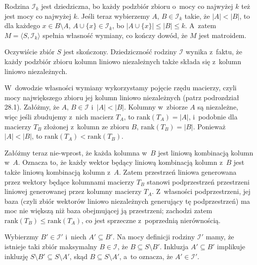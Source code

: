 
\exercise %
Rodzina $\mathcal{I}_k$ jest dziedziczna, bo każdy podzbiór zbioru o~mocy co najwyżej $k$ też jest mocy co najwyżej $k$.
Jeśli teraz wybierzemy $A$, $B\in\mathcal{I}_k$ takie, że $|A|<|B|$, to dla każdego $x\in B\setminus A$, $A\cup\{x\}\in\mathcal{I}_k$, bo $|A\cup\{x\}|\le|B|\le k$.
A~zatem $M=\langle S,\mathcal{I}_k\rangle$ spełnia własność wymiany, co kończy dowód, że $M$ jest matroidem.

\exercise %

\noindent Oczywiście zbiór $S$ jest skończony.
Dziedziczność rodziny $\mathcal{I}$ wynika z~faktu, że każdy podzbiór zbioru kolumn liniowo niezależnych także składa się z~kolumn liniowo niezależnych.

W~dowodzie własności wymiany wykorzystamy pojęcie rzędu macierzy, czyli mocy największego zbioru jej kolumn liniowo niezależnych (patrz podrozdział 28.1).
Załóżmy, że $A$, $B\in\mathcal{I}$ i~$|A|<|B|$.
Kolumny w~zbiorze $A$ są niezależne, więc jeśli zbudujemy z~nich macierz $T_A$, to $\mathrm{rank}(T_A)=|A|$, i~podobnie dla macierzy $T_B$ złożonej z~kolumn ze zbioru $B$, $\mathrm{rank}(T_B)=|B|$.
Ponieważ $|A|<|B|$, to $\mathrm{rank}(T_A)<\mathrm{rank}(T_B)$.

Załóżmy teraz nie-wprost, że każda kolumna w~$B$ jest liniową kombinacją kolumn w~$A$.
Oznacza to, że każdy wektor będący liniową kombinacją kolumn z~$B$ jest także liniową kombinacją kolumn z~$A$.
Zatem przestrzeń liniowa generowana przez wektory będące kolumnami macierzy $T_B$ stanowi podprzestrzeń przestrzeni liniowej generowanej przez kolumny macierzy $T_A$.
Z~własności podprzestrzeni, jej baza (czyli zbiór wektorów liniowo niezależnych generujący tę podprzestrzeń) ma moc nie większą niż baza obejmującej ją przestrzeni; zachodzi zatem $\mathrm{rank}(T_B)\le\mathrm{rank}(T_A)$, co jest sprzeczne z~poprzednią nierównością.

\exercise %
Wybierzmy $B'\in\mathcal{I}'$ i~niech $A'\subseteq B'$.
Na mocy definicji rodziny $\mathcal{I}'$ mamy, że istnieje taki zbiór maksymalny $B\in\mathcal{I}$, że $B\subseteq S\setminus B'$.
Inkluzja $A'\subseteq B'$ implikuje inkluzję $S\setminus B'\subseteq S\setminus A'$, skąd $B\subseteq S\setminus A'$, a~to oznacza, że $A'\in\mathcal{I}'$.

